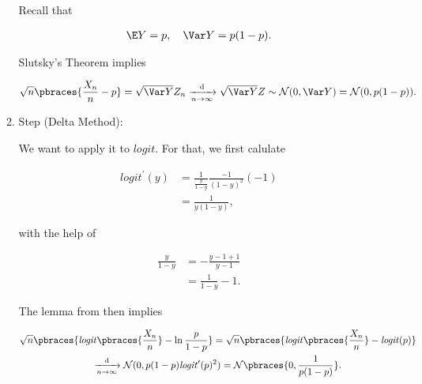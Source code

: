\begin{solution}
\begin{enumerate}[label = (\alph*)]
\begin{enumerate}[label = \arabic*.]
        Recall that

        \begin{align*}
            \E Y = p,
            \quad
            \Var Y = p (1 - p).
        \end{align*}

        Slutsky's Theorem \cite*[Lecture 4, Slide 70]{EStat} implies

        \begin{align*}
            \sqrt n \pbraces{\frac{X_n}{n} - p}
            =
            \sqrt{\Var Y} Z_n
            \xrightarrow[n \to \infty]{\mathrm d}
            \sqrt{\Var Y} Z
            \sim
            \mathcal N(0, \Var Y)
            =
            \mathcal N(0, p (1 - p)).
        \end{align*}

        \item Step (Delta Method):
        
        We want to apply it to $\mathit{logit}$.
        For that, we first calulate

        \begin{align*}
            \mathit{logit}^\prime(y)
            & =
            \frac{1}{\frac{y}{1 - y}} \frac{-1}{(1 - y)^2} (-1) \\
            & =
            \frac{1}{y (1 - y)},
        \end{align*}

        with the help of

        \begin{align*}
            \frac{y}{1 - y}
            & =
            -\frac{y - 1 + 1}{y - 1} \\
            & =
            \frac{1}{1 - y} - 1.
        \end{align*}

        The lemma from \cite*[Lecture 5, Slide 10]{EStat} then implies

        \begin{multline*}
            \sqrt n \pbraces{\mathit{logit} \pbraces{\frac{X_n}{n}} - \ln \frac{p}{1 - p}}
            =
            \sqrt n \pbraces{\mathit{logit} \pbraces{\frac{X_n}{n}} - \mathit{logit}(p)} \\
            \xrightarrow[n \to \infty]{\mathrm d}
            \mathcal N(0, p (1 - p) \mathit{logit}^\prime(p)^2)
            =
            \mathcal N \pbraces{0, \frac{1}{p (1 - p)}}.
        \end{multline*}

    \end{enumerate}

\end{enumerate}

\end{solution}

